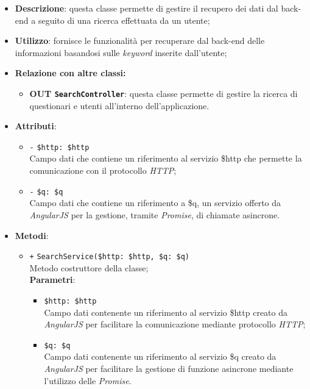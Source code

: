 \begin{itemize}
	\item \textbf{Descrizione}: questa classe permette di gestire il recupero dei dati dal back-end a seguito di una ricerca effettuata da un utente;
	\item \textbf{Utilizzo}: fornisce le funzionalità per recuperare dal back-end delle informazioni basandosi sulle \textit{keyword} inserite dall'utente;
	\item \textbf{Relazione con altre classi:}
	\begin{itemize}
		\item \textbf{OUT \texttt{SearchController}}: questa classe permette di gestire la ricerca di questionari e utenti all'interno dell'applicazione.
	\end{itemize}
	\item \textbf{Attributi}:
	\begin{itemize}
		\item \texttt{-} \texttt{\$http: \$http} \\ Campo dati che contiene un riferimento al servizio \$http che permette la comunicazione con il protocollo \textit{HTTP};
		\item \texttt{-} \texttt{\$q: \$q} \\ Campo dati che contiene un riferimento a \$q, un servizio offerto da \textit{AngularJS} per la gestione, tramite \textit{Promise}, di chiamate asincrone. 
	\end{itemize}
	\item \textbf{Metodi}:
	\begin{itemize}
		\item \texttt{+} \texttt{SearchService(\$http: \$http, \$q: \$q)} \\ Metodo costruttore della classe; \\
		\textbf{Parametri}:
		\begin{itemize}
			\item \texttt{\$http: \$http} \\ Campo dati contenente un riferimento al servizio \$http creato da \textit{AngularJS} per facilitare la comunicazione mediante protocollo \textit{HTTP};
			\item \texttt{\$q: \$q} \\ Campo dati contenente un riferimento al servizio \$q creato da \textit{AngularJS} per facilitare la gestione di funzione asincrone mediante l’utilizzo delle \textit{Promise}.
		\end{itemize}

\end{itemize}
\end{itemize}
